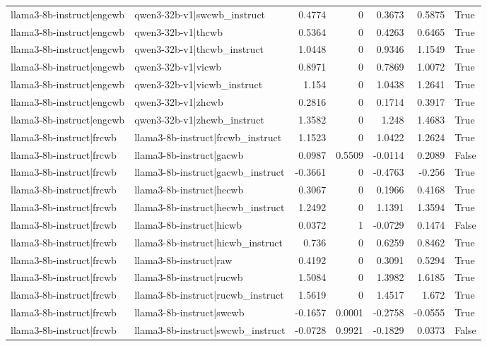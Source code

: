 \begin{table}
\begin{tabular}{l l r r r r l}
llama3-8b-instruct|engcwb & qwen3-32b-v1|swcwb_instruct & 0.4774 & 0 & 0.3673 & 0.5875 & True \\
llama3-8b-instruct|engcwb & qwen3-32b-v1|thcwb & 0.5364 & 0 & 0.4263 & 0.6465 & True \\
llama3-8b-instruct|engcwb & qwen3-32b-v1|thcwb_instruct & 1.0448 & 0 & 0.9346 & 1.1549 & True \\
llama3-8b-instruct|engcwb & qwen3-32b-v1|vicwb & 0.8971 & 0 & 0.7869 & 1.0072 & True \\
llama3-8b-instruct|engcwb & qwen3-32b-v1|vicwb_instruct & 1.154 & 0 & 1.0438 & 1.2641 & True \\
llama3-8b-instruct|engcwb & qwen3-32b-v1|zhcwb & 0.2816 & 0 & 0.1714 & 0.3917 & True \\
llama3-8b-instruct|engcwb & qwen3-32b-v1|zhcwb_instruct & 1.3582 & 0 & 1.248 & 1.4683 & True \\
llama3-8b-instruct|frcwb & llama3-8b-instruct|frcwb_instruct & 1.1523 & 0 & 1.0422 & 1.2624 & True \\
llama3-8b-instruct|frcwb & llama3-8b-instruct|gacwb & 0.0987 & 0.5509 & -0.0114 & 0.2089 & False \\
llama3-8b-instruct|frcwb & llama3-8b-instruct|gacwb_instruct & -0.3661 & 0 & -0.4763 & -0.256 & True \\
llama3-8b-instruct|frcwb & llama3-8b-instruct|hecwb & 0.3067 & 0 & 0.1966 & 0.4168 & True \\
llama3-8b-instruct|frcwb & llama3-8b-instruct|hecwb_instruct & 1.2492 & 0 & 1.1391 & 1.3594 & True \\
llama3-8b-instruct|frcwb & llama3-8b-instruct|hicwb & 0.0372 & 1 & -0.0729 & 0.1474 & False \\
llama3-8b-instruct|frcwb & llama3-8b-instruct|hicwb_instruct & 0.736 & 0 & 0.6259 & 0.8462 & True \\
llama3-8b-instruct|frcwb & llama3-8b-instruct|raw & 0.4192 & 0 & 0.3091 & 0.5294 & True \\
llama3-8b-instruct|frcwb & llama3-8b-instruct|rucwb & 1.5084 & 0 & 1.3982 & 1.6185 & True \\
llama3-8b-instruct|frcwb & llama3-8b-instruct|rucwb_instruct & 1.5619 & 0 & 1.4517 & 1.672 & True \\
llama3-8b-instruct|frcwb & llama3-8b-instruct|swcwb & -0.1657 & 0.0001 & -0.2758 & -0.0555 & True \\
llama3-8b-instruct|frcwb & llama3-8b-instruct|swcwb_instruct & -0.0728 & 0.9921 & -0.1829 & 0.0373 & False \\

\end{tabular}
\end{table}
